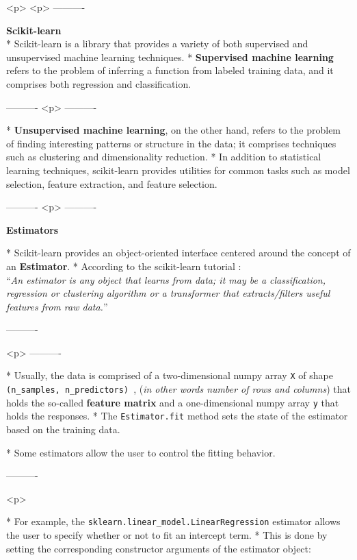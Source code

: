 <p>
\newpage
<p>
----------%
	
	\textbf{Scikit-learn}\\
	
*   Scikit-learn is a library that provides a variety of both supervised and unsupervised machine learning techniques. 
*   \textbf{Supervised machine learning} refers to the problem of inferring a function from labeled training data, and it comprises both regression and classification. 
	


----------%
<p>
----------%

	
	
	*  	
	\textbf{Unsupervised machine learning}, on the other hand, refers to the problem of finding interesting patterns or structure in the data; it comprises techniques such as clustering and dimensionality reduction.
*    In addition to statistical learning techniques, scikit-learn provides utilities for common tasks such as model selection, feature extraction, and feature selection.

----------%
<p>
\newpage
----------%
	
	\textbf{Estimators}

*   Scikit-learn provides an object-oriented interface centered around the concept of an \textbf{Estimator}. *   According to the scikit-learn tutorial : \\ “\textit{An estimator is any object that learns from data; it may be a classification, regression or clustering algorithm or a transformer that extracts/filters useful features from raw data.}” 	

----------%


<p>
----------%

*   Usually, the data is comprised of a two-dimensional numpy array \texttt{X} of shape \texttt{(n\_samples, n\_predictors) }, (\textit{in other words number of rows and columns}) that holds the so-called \textbf{feature matrix} and a one-dimensional numpy array \texttt{y} that holds the responses. 
*   The \texttt{Estimator.fit} method sets the state of the estimator based on the training data. 

*   Some estimators allow the user to control the fitting behavior. 

----------%


<p>
\newpage

	
	*   For example, the \texttt{sklearn.linear\_model.LinearRegression} estimator allows the user to specify whether or not to fit an intercept term. 
*   This is done by setting the corresponding constructor arguments of the estimator object:

